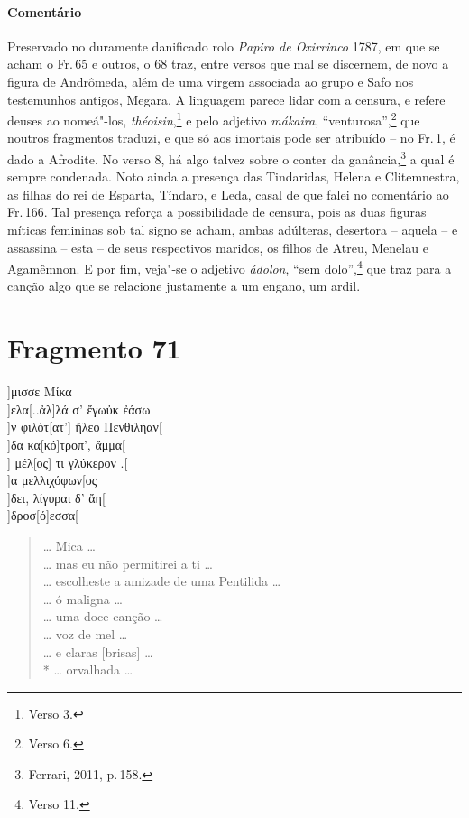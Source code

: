 \pagebreak
{\paragraph{Comentário} Preservado no duramente danificado rolo \textit{Papiro de Oxirrinco} 1787, em que se acham o Fr.\,65 e outros, o 68 traz, entre versos que mal se discernem, de novo a figura de Andrômeda, além de uma virgem associada ao grupo e Safo nos testemunhos antigos, Megara.  A linguagem parece lidar com a censura, e refere deuses ao nomeá"-los, \textit{théoisin},\footnote{Verso 3.} e pelo adjetivo \textit{mákaira}, ``venturosa'',\footnote{Verso 6.} que noutros fragmentos traduzi, e que só aos imortais pode ser atribuído -- no Fr.\,1, é dado a Afrodite. No verso 8, há algo talvez sobre o conter da ganância,\footnote{Ferrari, 2011, p.\,158.} a qual é sempre condenada. Noto ainda a presença das Tindaridas, Helena e Clitemnestra, as filhas do rei de Esparta, Tíndaro, e Leda, casal de que falei no comentário ao Fr.\,166. Tal presença reforça a possibilidade de censura, pois as duas figuras míticas femininas sob tal signo se acham, ambas adúlteras, desertora -- aquela -- e assassina -- esta -- de seus respectivos maridos, os filhos de Atreu, Menelau e Agamêmnon. E por fim, veja"-se o adjetivo \textit{ádolon}, ``sem dolo'',\footnote{Verso 11.} que traz para a canção algo que se relacione justamente a um engano, um ardil.}



\pagebreak
\section{Fragmento 71}

\begin{gkverse}
]μισσε Μίκα\\
]ελα[..ἀλ]λά σ’ ἔγωὐκ ἐάσω\\
         ]ν φιλότ[ατ’] ἤλεο Πενθιλήαν[\\
]δα κα[κό]τροπ’, ἄμμα[\\
    ] μέλ[ος] τι γλύκερον .[\\
    ]α μελλιχόφων[ος\\
    ]δει, λίγυραι δ’ ἄη[\\
        ]δροσ[ό]εσσα[
\end{gkverse}

\begin{verse}
\ldots{} Mica \ldots{}\\
\ldots{} mas eu não permitirei a ti \ldots{}\\
\ldots{} escolheste a amizade de uma Pentilida \ldots{}\\
\ldots{} ó maligna \ldots{}\\
\ldots{} uma doce canção \ldots{}\\
\ldots{} voz de mel \ldots{}\\
\ldots{} e claras [brisas] \ldots{}\\*
\ldots{} orvalhada \ldots{}
\end{verse}

